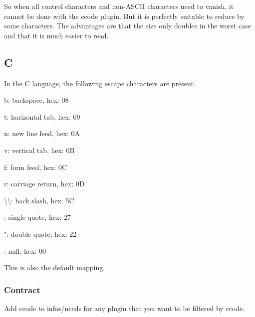 So when all control characters and non-\/\+A\+S\+C\+II characters need to vanish, it cannot be done with the ccode plugin. But it is perfectly suitable to reduce by some characters. The advantages are that the size only doubles in the worst case and that it is much easier to read.\hypertarget{autotoc_md79_autotoc_md82}{}\subsection{C}\label{autotoc_md79_autotoc_md82}
In the C language, the following escape characters are present.


\begin{DoxyItemize}
\item {\ttfamily b}\+: backspace, hex\+: 08
\item {\ttfamily t}\+: horizontal tab, hex\+: 09
\item {\ttfamily n}\+: new line feed, hex\+: 0A
\item {\ttfamily v}\+: vertical tab, hex\+: 0B
\item {\ttfamily f}\+: form feed, hex\+: 0C
\item {\ttfamily r}\+: carriage return, hex\+: 0D
\item {\ttfamily \textbackslash{}\textbackslash{}}\+: back slash, hex\+: 5C
\item {\ttfamily \textquotesingle{}}\+: single quote, hex\+: 27
\item {\ttfamily "}\+: double quote, hex\+: 22
\item {}\+: null, hex\+: 00
\end{DoxyItemize}

This is also the default mapping.\hypertarget{autotoc_md79_autotoc_md83}{}\subsubsection{Contract}\label{autotoc_md79_autotoc_md83}
Add {\ttfamily ccode} to {\ttfamily infos/needs} for any plugin that you want to be filtered by ccode. 